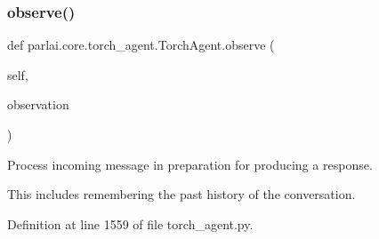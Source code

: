 \mbox{\label{classparlai_1_1core_1_1torch__agent_1_1TorchAgent_a87b18f0d6ab11be3c49375af072d0d33}} 
\subsubsection{\texorpdfstring{observe()}{observe()}}
{\footnotesize\ttfamily def parlai.\+core.\+torch\+\_\+agent.\+Torch\+Agent.\+observe (\begin{DoxyParamCaption}\item[{}]{self,  }\item[{}]{observation }\end{DoxyParamCaption})}

\begin{DoxyVerb}Process incoming message in preparation for producing a response.

This includes remembering the past history of the conversation.
\end{DoxyVerb}
 

Definition at line 1559 of file torch\+\_\+agent.\+py.


